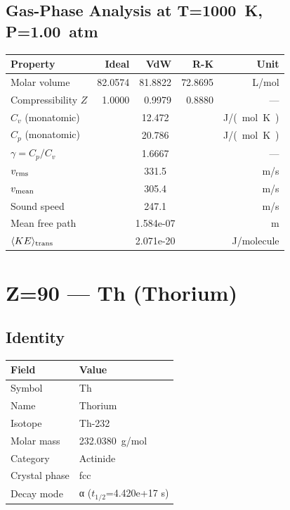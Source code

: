 \documentclass[11pt,a4paper]{article}
\begin{document}
\subsection{Gas-Phase Analysis at T=\SI{1000}{K}, P=\SI{1.00}{atm}}
\begin{tabular}{lrrrr}
  \toprule
  Property & Ideal & VdW & R-K & Unit \\
  \midrule
  Molar volume & 82.0574 & 81.8822 & 72.8695 & \si{L/mol} \\
  Compressibility $Z$ & 1.0000 & 0.9979 & 0.8880 & --- \\
  \midrule
  $C_v$ (monatomic) & \multicolumn{3}{c}{12.472} & \si{J/(mol.K)} \\
  $C_p$ (monatomic) & \multicolumn{3}{c}{20.786} & \si{J/(mol.K)} \\
  $\gamma = C_p/C_v$ & \multicolumn{3}{c}{1.6667} & --- \\
  $v_{\rm rms}$ & \multicolumn{3}{c}{331.5} & \si{m/s} \\
  $v_{\rm mean}$ & \multicolumn{3}{c}{305.4} & \si{m/s} \\
  Sound speed & \multicolumn{3}{c}{247.1} & \si{m/s} \\
  Mean free path & \multicolumn{3}{c}{1.584e-07} & \si{m} \\
  $\langle KE \rangle_{\rm trans}$ & \multicolumn{3}{c}{2.071e-20} & \si{J/molecule} \\
  \bottomrule
\end{tabular}

\newpage

\section{Z=90 --- Th (Thorium)}
\label{sec:Z90}

\subsection{Identity}
\begin{tabular}{ll}
  \toprule
  Field & Value \\
  \midrule
  Symbol & Th \\
  Name & Thorium \\
  Isotope & Th-232 \\
  Molar mass & \SI{232.0380}{g/mol} \\
  Category & Actinide \\
  Crystal phase & fcc \\
  Decay mode & α ($t_{1/2}$=4.420e+17 s) \\
  \bottomrule
\end{tabular}
\end{document}
